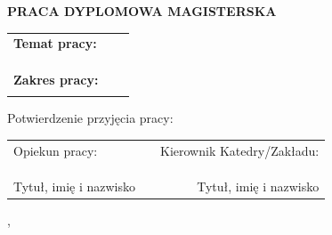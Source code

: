 {  \begin{center}
    \vspace{1cm}
    \LARGE{\textbf{\uppercase{Praca dyplomowa magisterska}}}
  \end{center}
  \vspace{1cm}
	
	\begin{large}
		\begin{tabular}{@{}llr@{}}
			\textbf{Temat pracy:} \\ \@title\\
			\\
			
			\\
			\textbf{Zakres pracy:} \\ \@descr\\
		\end{tabular}
		
		\vspace{2.5cm}
		Potwierdzenie przyjęcia pracy:
		\vspace{1cm}
		
		\begin{tabular}{@{}lp{5cm}r@{}}
			Opiekun pracy: & & Kierownik Katedry/Zakładu: \\ \\ \\ \\
			Tytuł, imię i nazwisko & & Tytuł, imię i nazwisko
		\end{tabular}
		
		\begin{center}
			\@miasto, \@date
		\end{center}
	\end{large}
	
	\pagebreak
	\addtolength{\hoffset}{0.5cm}
	\addtolength{\voffset}{1.5cm}
	\addtolength{\textwidth}{-0.5cm}
}

\makeatother

\cleardoublepage